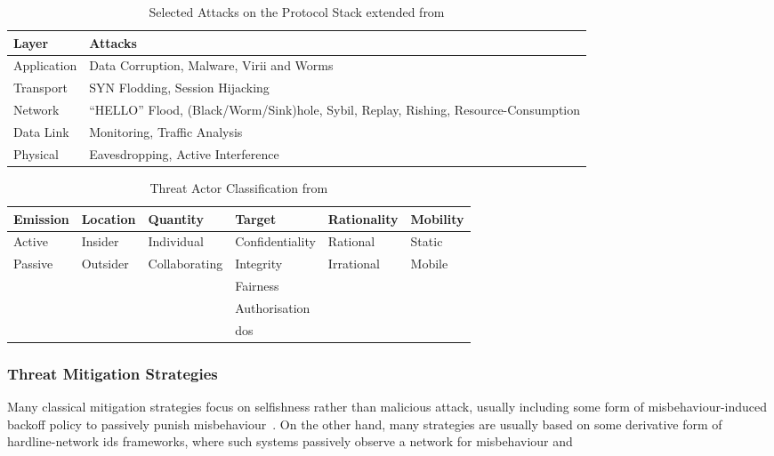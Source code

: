 \begin{table}
  \caption[Selected Attacks on the Protocol Stack]{Selected Attacks on the Protocol Stack extended from \cite{csen2010security}}
  \label{tab:stack_attacks}
  \begin{tabularx}{\textwidth}{p{5cm} X}\toprule
    Layer & Attacks\\\midrule
    Application & Data Corruption, Malware, Virii and Worms\\
    Transport & SYN Flodding, Session Hijacking\\
    Network & ``HELLO'' Flood, (Black/Worm/Sink)hole, Sybil, Replay, Rishing, Resource-Consumption\\
    Data Link & Monitoring, Traffic Analysis\\
    Physical& Eavesdropping, Active Interference\\\bottomrule
  \end{tabularx}
\end{table}

\begin{table}
  \caption[Threat Actor Classification]{Threat Actor Classification from \citet{Gagandeep2012}}
  \label{tab:attacker_class}
  \begin{tabularx}{\textwidth}{X X X X X X}\toprule
    Emission & Location & Quantity & Target & Rationality & Mobility \\\midrule
    Active & Insider & Individual & Confidentiality & Rational & Static\\
    Passive & Outsider & Collaborating & Integrity & Irrational & Mobile\\
            &         &               & Fairness & & \\
            &         &               & Authorisation & &\\
            &         &               &  \gls{dos} & &\\
    \bottomrule
    
  \end{tabularx}
\end{table}


\subsubsection{Threat Mitigation Strategies}



Many classical mitigation strategies focus on selfishness rather than malicious attack, usually including some form of misbehaviour-induced backoff policy to passively punish misbehaviour~\cite{Konorski2002,Cardenas:2004:DPM:1029102.1029107}.
On the other hand, many  strategies are usually based on some derivative form of hardline-network \gls{ids} frameworks, where such systems passively observe a network for misbehaviour and 

